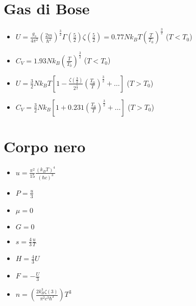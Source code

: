 \documentclass[a4paper]{article}
\begin{document}
    \section{Gas di Bose}
        \begin{itemize}
            \item $U=\frac{g_s}{4\pi^2}\left(\frac{2m}{\hbar^2}\right)^{\frac{3}{2}}\Gamma\left(\frac{5}{2}\right)\zeta\left(\frac{5}{2}\right)=0.77Nk_BT\left(\frac{T}{T_0}\right)^{\frac{3}{2}}$ ($T<T_0$)
            \item $C_V=1.93Nk_B\left(\frac{T}{T_0}\right)^{\frac{3}{2}}$ ($T<T_0$)
            \item $U=\frac{3}{2}Nk_BT\left[1-\frac{\zeta\left(\frac{3}{2}\right)}{2^{\frac{5}{2}}}\left(\frac{T_0}{T}\right)^{\frac{3}{2}}+\ldots\right]$ ($T>T_0$)
            \item $C_V=\frac{3}{2}Nk_B\left[1+0.231\left(\frac{T_0}{T}\right)^{\frac{3}{2}}+\ldots\right]$ ($T>T_0$)
        \end{itemize}
    
    \section{Corpo nero}
        \begin{itemize}
            \item $u=\frac{\pi^2}{15}\frac{(k_BT)^4}{(\hbar c)^3}$
            \item $P=\frac{u}{3}$
            \item $\mu=0$
            \item $G=0$
            \item $s=\frac{4}{3}\frac{u}{T}$
            \item $H=\frac{4}{3}U$
            \item $F=-\frac{U}{3}$
            \item $n=\left(\frac{2k_B^3\zeta(3)}{\pi^2c^3\hbar^3}\right)T^3$
        \end{itemize}
\end{document}
